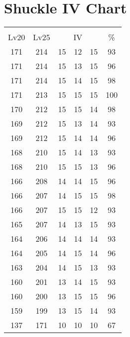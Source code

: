 \documentclass{article}%
\begin{document}
%
\normalsize%
\section{Shuckle IV Chart}%
\label{sec:Shuckle IV Chart}%
\renewcommand{\arraystretch}{1.5}%
\begin{tabular}{|c|c|c|c|c|c|}%
\hline%
\multicolumn{6}{|c|}{\textcolor{white}{ 
\linebreak{Shuckle}
}%
\cellcolor{black}}\\%
\multicolumn{1}{|c}{Lv20}&\multicolumn{1}{c|}{Lv25}&\multicolumn{3}{c|}{IV}&\multicolumn{1}{|c|}{\%}\\%
\hline%
\rowcolor{color93}%
171&214&15&12&15&93\\%
\hline%
\rowcolor{color96}%
171&214&15&13&15&96\\%
\hline%
\rowcolor{color98}%
171&214&15&14&15&98\\%
\hline%
\rowcolor{color100}%
171&213&15&15&15&100\\%
\hline%
\rowcolor{color98}%
170&212&15&15&14&98\\%
\hline%
\rowcolor{color93}%
169&212&15&13&14&93\\%
\hline%
\rowcolor{color96}%
169&212&15&14&14&96\\%
\hline%
\rowcolor{color93}%
168&210&15&14&13&93\\%
\hline%
\rowcolor{color96}%
168&210&15&15&13&96\\%
\hline%
\rowcolor{color96}%
166&208&14&14&15&96\\%
\hline%
\rowcolor{color98}%
166&207&14&15&15&98\\%
\hline%
\rowcolor{color93}%
166&207&15&15&12&93\\%
\hline%
\rowcolor{color93}%
165&207&14&13&15&93\\%
\hline%
\rowcolor{color93}%
164&206&14&14&14&93\\%
\hline%
\rowcolor{color96}%
164&205&14&15&14&96\\%
\hline%
\rowcolor{color93}%
163&204&14&15&13&93\\%
\hline%
\rowcolor{color93}%
160&201&13&14&15&93\\%
\hline%
\rowcolor{color96}%
160&200&13&15&15&96\\%
\hline%
\rowcolor{color93}%
159&199&13&15&14&93\\%
\hline%
\rowcolor{color91}%
137&171&10&10&10&67\\%
\end{tabular}

%
\end{document}
